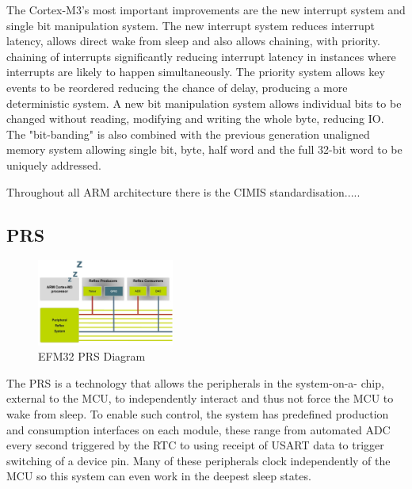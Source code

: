 The Cortex-M3's most important improvements are the new interrupt system and single bit
manipulation system. The new interrupt system reduces interrupt latency, allows direct wake from
sleep and also allows chaining, with priority. chaining of interrupts significantly reducing interrupt
latency in instances where interrupts are likely to happen simultaneously. The priority system allows
key events to be reordered reducing the chance of delay, producing a more deterministic system. A
new bit manipulation system allows individual bits to be changed without reading, modifying and
writing the whole byte, reducing IO. The "bit-banding" is also combined with the previous
generation unaligned memory system allowing single bit, byte, half word and the full 32-bit word to
be uniquely addressed.


Throughout all ARM architecture there is the CIMIS standardisation.....

\cite{Sadasivan 2006} \cite{Arm2012, EnergyMicro2011}


\subsection{\acf{PRS}}

\begin{figure}
  \vspace{-10pt}
  \begin{center}
    \includegraphics[width=0.4\textwidth, keepaspectratio=true]{images/peripheralreflexsystem_croped.jpg}
  \end{center}
  \caption[EFM32 \ac{PRS} Diagram]{EFM32 \ac{PRS} Diagram \cite{EFM32Tech}}
  \vspace{-10pt}
\end{figure}

The \ac{PRS} is a technology that allows the peripherals in the system-on-a-
chip, external to the \ac{MCU}, to independently interact and thus not force the \ac{MCU} to wake from
sleep. To enable such control, the system has predefined production and consumption interfaces on
each module, these range from automated ADC every second triggered by the \ac{RTC} to using receipt
of \ac{USART} data to trigger switching of a device pin. Many of these peripherals clock independently of
the \ac{MCU} so this system can even work in the deepest sleep states.

